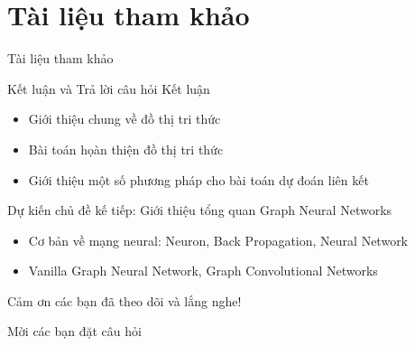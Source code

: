\documentclass[notheorems, aspectratio=54]{beamer}
\begin{document}
	\section{Tài liệu tham khảo}
	\begin{frame}{Tài liệu tham khảo}
		\nocite{*}
		\newpage\cleardoublepage
		
	\end{frame}
	\begin{frame}{Kết luận và Trả lời câu hỏi}
		Kết luận
		\begin{itemize}
			\item Giới thiệu chung về đồ thị tri thức
			\item Bài toán họàn thiện đồ thị tri thức
			\item Giới thiệu một số phương pháp cho bài toán dự đoán liên kết
		\end{itemize}
		Dự kiến chủ đề kế tiếp: Giới thiệu tổng quan Graph Neural Networks
		\begin{itemize}
			\item Cơ bản về mạng neural: Neuron, Back Propagation, Neural Network
			\item Vanilla Graph Neural Network, Graph Convolutional Networks
		\end{itemize}
		Cảm ơn các bạn đã theo dõi và lắng nghe!
		
		Mời các bạn đặt câu hỏi
	\end{frame}
\end{document}
